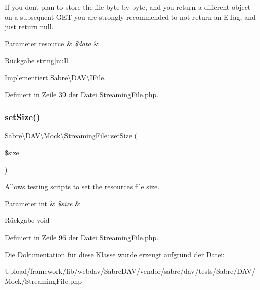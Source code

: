 If you don\textquotesingle{}t plan to store the file byte-\/by-\/byte, and you return a different object on a subsequent G\+ET you are strongly recommended to not return an E\+Tag, and just return null.


\begin{DoxyParams}[1]{Parameter}
resource & {\em \$data} & \\
\hline
\end{DoxyParams}
\begin{DoxyReturn}{Rückgabe}
string$\vert$null 
\end{DoxyReturn}


Implementiert \mbox{\hyperlink{interface_sabre_1_1_d_a_v_1_1_i_file_a0c30bc87b22d289f311c854f23993452}{Sabre\textbackslash{}\+D\+A\+V\textbackslash{}\+I\+File}}.



Definiert in Zeile 39 der Datei Streaming\+File.\+php.

\mbox{\label{class_sabre_1_1_d_a_v_1_1_mock_1_1_streaming_file_a706476699b3eed39ee2fa533891155fe}} 
\subsubsection{\texorpdfstring{set\+Size()}{setSize()}}
{\footnotesize\ttfamily Sabre\textbackslash{}\+D\+A\+V\textbackslash{}\+Mock\textbackslash{}\+Streaming\+File\+::set\+Size (\begin{DoxyParamCaption}\item[{}]{\$size }\end{DoxyParamCaption})}

Allows testing scripts to set the resource\textquotesingle{}s file size.


\begin{DoxyParams}[1]{Parameter}
int & {\em \$size} & \\
\hline
\end{DoxyParams}
\begin{DoxyReturn}{Rückgabe}
void 
\end{DoxyReturn}


Definiert in Zeile 96 der Datei Streaming\+File.\+php.



Die Dokumentation für diese Klasse wurde erzeugt aufgrund der Datei\+:\begin{DoxyCompactItemize}
\item 
Upload/framework/lib/webdav/\+Sabre\+D\+A\+V/vendor/sabre/dav/tests/\+Sabre/\+D\+A\+V/\+Mock/Streaming\+File.\+php\end{DoxyCompactItemize}
